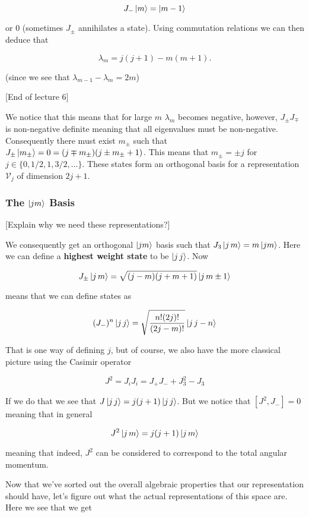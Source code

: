 \documentclass{article}
\theoremstyle{definition}
\begin{document}
$$ J_- \ket{m} = \ket{m - 1} $$

or 0 (sometimes $J_\pm$ annihilates a state). Using commutation relations we can
then deduce that

$$ \lambda_m = j(j + 1) - m(m + 1). $$

(since we see that $\lambda_{m - 1} - \lambda_m = 2m$)

[End of lecture 6]

We notice that this means that for large $m$ $\lambda_m$ becomes negative,
however, $J_\pm J_\mp$ is non-negative definite meaning that all eigenvalues
must be non-negative. Consequently there must exist $m_\pm$ such that $J_\pm
\ket{m_\pm} = 0 = (j \mp m_\pm)(j \pm m_\pm + 1)$. This means that $m_\pm = \pm
j$ for $j \in \{0, 1/2, 1, 3/2, \dots\}$. These states form an orthogonal basis
for a representation $\mathcal{V}_j$ of dimension $2j + 1$.

\subsubsection{The $\ket{j m}$ Basis}

[Explain why we need these representations?]

We consequently get an orthogonal $\ket{jm}$ basis such that $J_3 \ket{j\,m} = m
\ket{j m}$. Here we can define a \textbf{highest weight state} to be $\ket{j\,j}$.
Now

$$ J_\pm \ket{j\,m} = \sqrt{(j - m)(j + m + 1)} \ket{j\, m \pm 1} $$

means that we can define states as

$$ (J_-)^n \ket{j \, j} = \sqrt{\frac{n! (2j)!}{(2j - m)!}} \ket{j \, j - n} $$

That is one way of defining $j$, but of course, we also have the more classical
picture using the Casimir operator

$$ J^2 = J_i J_i = J_+ J_- + J_3^2 - J_3 $$

If we do that we see that $J\ket{j\, j} = j(j + 1) \ket{j\, j}$. But we notice
that $[J^2, J_-] = 0$ meaning that in general

$$ J^2 \ket{j \, m} = j(j + 1) \ket{j\, m} $$

meaning that indeed, $J^2$ can be considered to correspond to the total angular
momentum. 

Now that we've sorted out the overall algebraic properties that our
representation should have, let's figure out what the actual representations of
this space are. Here we see that we get
\end{document}
